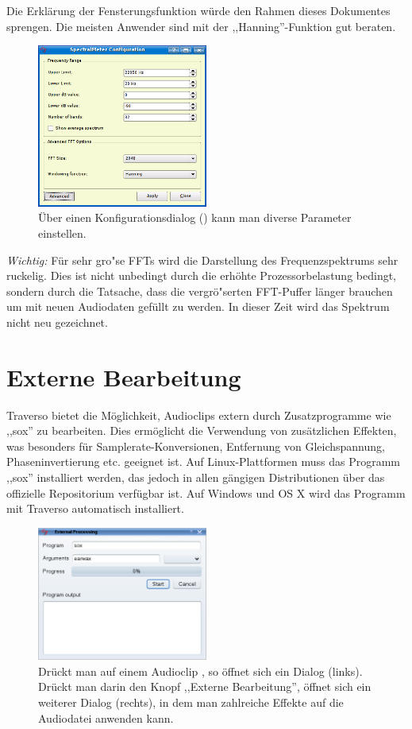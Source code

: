 Die Erklärung der Fensterungsfunktion würde den Rahmen dieses Dokumentes sprengen. Die meisten Anwender sind mit der ,,Hanning''-Funktion gut beraten.

\begin{figure}
	\centering
	\includegraphics[width=0.5\textwidth]{../images/fft3}
	\caption{Über einen Konfigurationsdialog () kann man diverse Parameter einstellen.}
	\label{fig_fft3}
\end{figure}

\emph{Wichtig:} Für sehr gro"se FFTs wird die Darstellung des Frequenzspektrums sehr ruckelig. Dies ist nicht unbedingt durch die erhöhte Prozessorbelastung bedingt, sondern durch die Tatsache, dass die vergrö"serten FFT-Puffer länger brauchen um mit neuen Audiodaten gefüllt zu werden. In dieser Zeit wird das Spektrum nicht neu gezeichnet.

\section{Externe Bearbeitung}
Traverso bietet die Möglichkeit, Audioclips extern durch Zusatzprogramme wie ,,sox'' \cite{sox} zu bearbeiten. Dies ermöglicht die Verwendung von zusätzlichen Effekten, was besonders für Samplerate-Konversionen, Entfernung von Gleichspannung, Phaseninvertierung etc. geeignet ist. Auf Linux-Plattformen muss das Programm ,,sox'' installiert werden, das jedoch in allen gängigen Distributionen über das offizielle Repositorium verfügbar ist. Auf Windows und OS X wird das Programm mit Traverso automatisch installiert.

\begin{figure}
	\centering
	\includegraphics[width=0.5\textwidth]{../images/external00}
	\caption{Drückt man auf einem Audioclip , so öffnet sich ein Dialog (links). Drückt man darin den Knopf ,,Externe Bearbeitung'', öffnet sich ein weiterer Dialog (rechts), in dem man zahlreiche Effekte auf die Audiodatei anwenden kann.}
	\label{fig_external01}
\end{figure}

